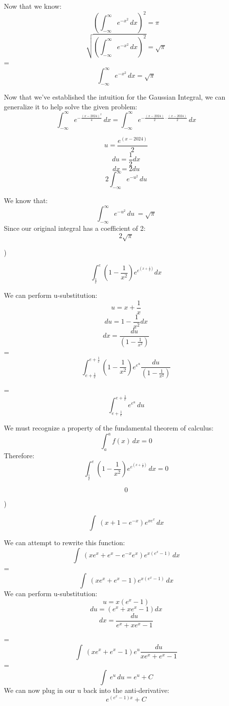 \documentclass{article}
\begin{document}
\begin{flushleft}
\noindent Now that we know:
\[(\int_{-\infty}^{\infty} e^{-x^2}\,dx)^2 = \pi\]
\[\sqrt{(\int_{-\infty}^{\infty} e^{-x^2}\,dx)^2} = \sqrt{\pi}\]
= \[\int_{-\infty}^{\infty} e^{-x^2}\,dx = \sqrt{\pi}\]


\noindent Now that we've established the intuition for the Gaussian Integral, we can generalize it to help solve the given problem:
\[
\int_{-\infty}^{\infty} e^{-\frac{(x-2024)^2}{4}} \, dx = \int_{-\infty}^{\infty} e^{-\frac{(x-2024)}{2} \cdot \frac{(x-2024)}{2}} \, dx
\]

\[u = \frac{e^{(x-2024)}}{2} \]
\[du = \frac{1}{2}dx\]
\[dx = 2du\]
\[2 \int_{-\infty}^{\infty} e^{-u^2}\,du\]

\noindent We know that:
\[\int_{-\infty}^{\infty} e^{-u^2}\,du\ = \sqrt{\pi}\]
Since our original integral has a coefficient of 2:
\[\boxed{2\sqrt{\pi}}\]
\end{flushleft}


)
\begin{flushleft}
\[\int_{\frac{1}{e}}^{e}\left(1-\frac{1}{x^{2}}\right)e^{e^{\left(x+\frac{1}{x}\right)}}dx\]

\noindent We can perform u-substitution:
\[u = x+\frac{1}{x}\]
\[du = 1-\frac{1}{x^2}dx\]
\[dx = \frac{du}{(1-\frac{1}{x^2})}\]
=\[\int_{e+\frac{1}{e}}^{e+\frac{1}{e}}\left(1-\frac{1}{x^{2}}\right)e^{e^{u}} \frac{du}{(1-\frac{1}{x^2})}\]

=\[\int_{e+\frac{1}{e}}^{e+\frac{1}{e}} e^{e^u} \,du\]

\noindent We must recognize a property of the fundamental theorem of calculus:
\[\int_{a}^{a}f(x)\,dx = 0\]
\noindent Therefore:
\[\int_{\frac{1}{e}}^{e}\left(1-\frac{1}{x^{2}}\right)e^{e^{\left(x+\frac{1}{x}\right)}} \, dx = 0\]

\[\boxed{0}\]
\end{flushleft}


)
\begin{flushleft}
\[\int\ \left(x+1-e^{-x}\right)e^{xe^{x}} \,dx\]

\noindent We can attempt to rewrite this function:
\[\int\ \left(xe^{x}+e^{x}-e^{-x}e^{x}\right)e^{x\left(e^{x}-1\right)} \,dx\]
=\[\int\ \left(xe^{x}+e^{x}-1\right)e^{x\left(e^{x}-1\right)} \,dx\]
We can perform u-substitution:
\[u=x(e^{x}-1)\]
\[du = (e^{x}+xe^{x}-1)dx\]
\[dx = \frac{du}{e^{x}+xe^{x}-1}\]

=\[\int\ \left(xe^{x}+e^{x}-1\right)e^{u} \frac{du}{xe^{x}+e^{x}-1}\]
=\[\int\ e^u \,du = e^u+C\]
We can now plug in our u back into the anti-derivative:
\[\boxed{e^{(e^{x}-1)x} + C}\]
\end{flushleft}
\end{document}

